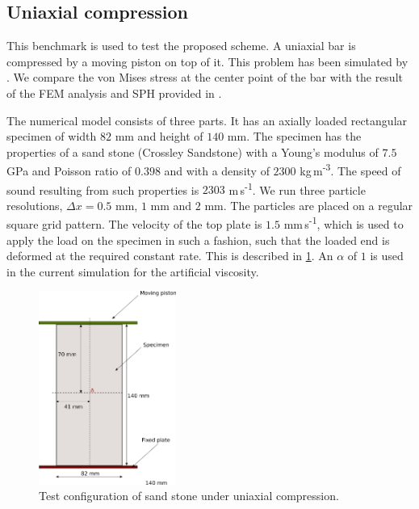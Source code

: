 \documentclass[preprint,12pt]{elsarticle}
\begin{document}
%
%
%
%
\FloatBarrier%
\subsection{Uniaxial compression}
\label{sec:uniaxial-compression}

This benchmark is used to test the proposed scheme. A uniaxial bar is
compressed by a moving piston on top of it. This problem has been simulated by
\citet{das2015evaluation}. We compare the von Mises stress at the center point
of the bar with the result of the FEM analysis and SPH provided in
\cite{das2015evaluation}.

The numerical model consists of three parts. It has an axially loaded
rectangular specimen of width $82$ mm and height of $140$ mm. The specimen has
the properties of a sand stone (Crossley Sandstone) with a Young's modulus of
$7.5$ GPa and Poisson ratio of $0.398$ and with a density of $2300$
kg\,m\textsuperscript{-3}. The speed of sound resulting from such properties is
$2303$ m\,s\textsuperscript{-1}. We run three particle resolutions,
$\Delta x = 0.5$ mm, $1$ mm and $2$ mm. The particles are placed on a regular
square grid pattern. The velocity of the top plate is
$1.5$ mm\,s\textsuperscript{-1}, which is used to apply the load on the specimen in
such a fashion, such that the loaded end is deformed at the required constant
rate. This is described in \cref{fig:uniaxial_test_configuration}. An $\alpha$
of $1$ is used in the current simulation for the artificial viscosity.

\begin{figure}[!htpb]
  \centering
  \includegraphics[width=0.4\textwidth]{images/uniaxial_compression/uniaxial_compression}
  \caption{Test configuration of sand stone under uniaxial compression.}
\label{fig:uniaxial_test_configuration}
\end{figure}
\end{document}
